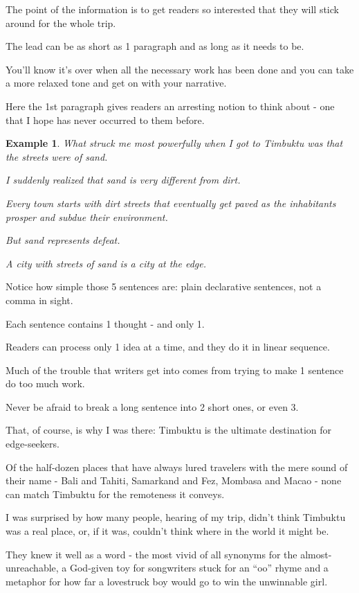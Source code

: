 \documentclass{book}
\numberwithin{equation}{section}
\newtheorem{example}{Example}[chapter]
\begin{document}
The point of the information is to get readers so interested that they will stick around for the whole trip.

The lead can be as short as 1 paragraph and as long as it needs to be.

You'll know it's over when all the necessary work has been done and you can take a more relaxed tone and get on with your narrative.

Here the 1st paragraph gives readers an arresting notion to think about - one that I hope has never occurred to them before.
\begin{example}
    What struck me most powerfully when I got to Timbuktu was that the streets were of sand.
    
    I suddenly realized that sand is very different from dirt.
    
    Every town starts with dirt streets that eventually get paved as the inhabitants prosper and subdue their environment.
    
    But sand represents defeat.
    
    A city with streets of sand is a city at the edge.
\end{example}
Notice how simple those 5 sentences are: plain declarative sentences, not a comma in sight.

Each sentence contains 1 thought - and only 1.

Readers can process only 1 idea at a time, and they do it in linear sequence.

Much of the trouble that writers get into comes from trying to make 1 sentence do too much work.

Never be afraid to break a long sentence into 2 short ones, or even 3.

%
That, of course, is why I was there: Timbuktu is the ultimate destination for edge-seekers.

Of the half-dozen places that have always lured travelers with the mere sound of their name - Bali and Tahiti, Samarkand and Fez, Mombasa and Macao - none can match Timbuktu for the remoteness it conveys.

I was surprised by how many people, hearing of my trip, didn't think Timbuktu was a real place, or, if it was, couldn't think where in the world it might be.

They knew it well as a word - the most vivid of all synonyms for the almost-unreachable, a God-given toy for songwriters stuck for an ``oo'' rhyme and a metaphor for how far a lovestruck boy would go to win the unwinnable girl.
\end{document}
